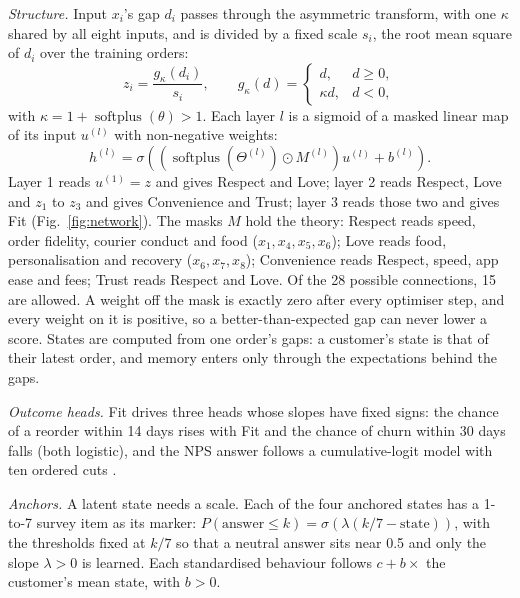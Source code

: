 \documentclass[10pt,twocolumn,letterpaper]{article}
\newcommand{\runin}[1]{\textit{#1}\hspace{0.4em}}
\begin{document}
\runin{Structure.} Input $x_i$'s gap $d_i$ passes through the asymmetric transform, with one $\kappa$ shared by all eight inputs, and is divided by a fixed scale $s_i$, the root mean square of $d_i$ over the training orders:
\begin{equation}
z_i = \frac{g_\kappa(d_i)}{s_i}, \qquad g_\kappa(d) = \begin{cases} d, & d \geq 0, \\ \kappa d, & d < 0, \end{cases}
\end{equation}
with $\kappa = 1 + \operatorname{softplus}(\theta) > 1$. Each layer $l$ is a sigmoid of a masked linear map of its input $u^{(l)}$ with non-negative weights:
\begin{equation}
h^{(l)} = \sigma\!\left( \left( \operatorname{softplus}(\Theta^{(l)}) \odot M^{(l)} \right) u^{(l)} + b^{(l)} \right).
\end{equation}
Layer 1 reads $u^{(1)} = z$ and gives Respect and Love; layer 2 reads Respect, Love and $z_1$ to $z_3$ and gives Convenience and Trust; layer 3 reads those two and gives Fit (Fig.~\ref{fig:network}). The masks $M$ hold the theory: Respect reads speed, order fidelity, courier conduct and food ($x_1, x_4, x_5, x_6$); Love reads food, personalisation and recovery ($x_6, x_7, x_8$); Convenience reads Respect, speed, app ease and fees; Trust reads Respect and Love. Of the 28 possible connections, 15 are allowed. A weight off the mask is exactly zero after every optimiser step, and every weight on it is positive, so a better-than-expected gap can never lower a score. States are computed from one order's gaps: a customer's state is that of their latest order, and memory enters only through the expectations behind the gaps.

\runin{Outcome heads.} Fit drives three heads whose slopes have fixed signs: the chance of a reorder within 14 days rises with Fit and the chance of churn within 30 days falls (both logistic), and the NPS answer follows a cumulative-logit model with ten ordered cuts \cite{mccullagh1980}.

\runin{Anchors.} A latent state needs a scale. Each of the four anchored states has a 1-to-7 survey item as its marker: $P(\text{answer} \leq k) = \sigma(\lambda(k/7 - \text{state}))$, with the thresholds fixed at $k/7$ so that a neutral answer sits near 0.5 and only the slope $\lambda > 0$ is learned. Each standardised behaviour follows $c + b \times$ the customer's mean state, with $b > 0$.
\end{document}
